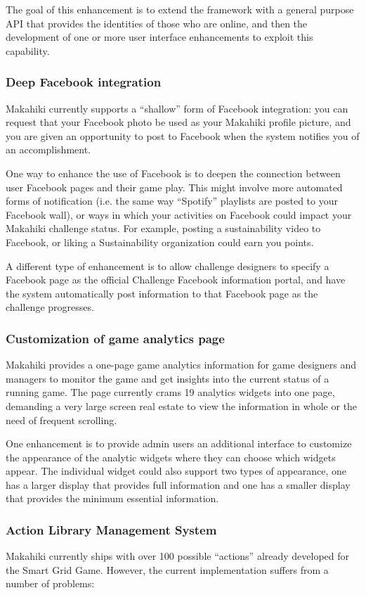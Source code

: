 The goal of this enhancement is to extend the framework with a general purpose API that provides the identities of those who are online, and then the development of one or more user interface enhancements to exploit this capability.

\subsubsection{Deep Facebook integration}
Makahiki currently supports a ``shallow'' form of Facebook integration: you can request that your Facebook photo be used as your Makahiki profile picture, and you are given an opportunity to post to Facebook when the system notifies you of an accomplishment. 

One way to enhance the use of Facebook is to deepen the connection between user Facebook pages and their game play. This might involve more automated forms of notification (i.e. the same way ``Spotify'' playlists are posted to your Facebook wall), or ways in which your activities on Facebook could impact your Makahiki challenge status. For example, posting a sustainability video to Facebook, or liking a Sustainability organization could earn you points. 

A different type of enhancement is to allow challenge designers to specify a Facebook page as the official Challenge Facebook information portal, and have the system automatically post information to that Facebook page as the challenge progresses.

\subsubsection{Customization of game analytics page}
\label{sec:future-game-manage}
Makahiki provides a one-page game analytics information for game designers and managers to monitor the game and get insights into the current status of a running game. The page currently crams 19 analytics widgets into one page, demanding a very large screen real estate to view the information in whole or the need of frequent scrolling. 

One enhancement is to provide admin users an additional interface to customize the appearance of the analytic widgets where they can choose which widgets appear. The individual widget could also support two types of appearance, one has a larger display that provides full information and one has a smaller display that provides the minimum essential information. 

\subsubsection{Action Library Management System}
Makahiki currently ships with over 100 possible  ``actions'' already developed for the Smart Grid Game. However, the current implementation suffers from a number of problems:

